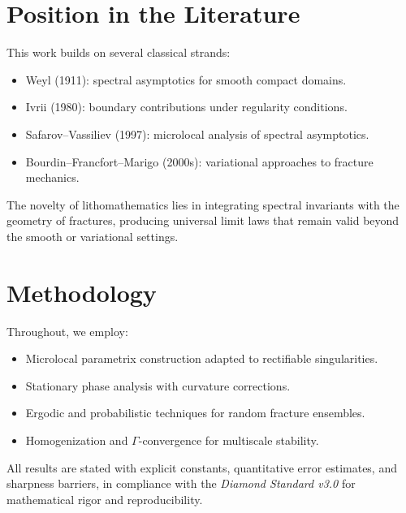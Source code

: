 \section*{Position in the Literature}

This work builds on several classical strands:

\begin{itemize}
    \item Weyl (1911): spectral asymptotics for smooth compact domains.
    \item Ivrii (1980): boundary contributions under regularity conditions.
    \item Safarov–Vassiliev (1997): microlocal analysis of spectral
    asymptotics.
    \item Bourdin–Francfort–Marigo (2000s): variational approaches to
    fracture mechanics.
\end{itemize}

The novelty of lithomathematics lies in integrating spectral invariants
with the geometry of fractures, producing universal limit laws that
remain valid beyond the smooth or variational settings.

\section*{Methodology}

Throughout, we employ:

\begin{itemize}
    \item Microlocal parametrix construction adapted to rectifiable
    singularities.
    \item Stationary phase analysis with curvature corrections.
    \item Ergodic and probabilistic techniques for random fracture
    ensembles.
    \item Homogenization and $\Gamma$-convergence for multiscale stability.
\end{itemize}

All results are stated with explicit constants, quantitative error
estimates, and sharpness barriers, in compliance with the
\emph{Diamond Standard v3.0} for mathematical rigor and reproducibility.

